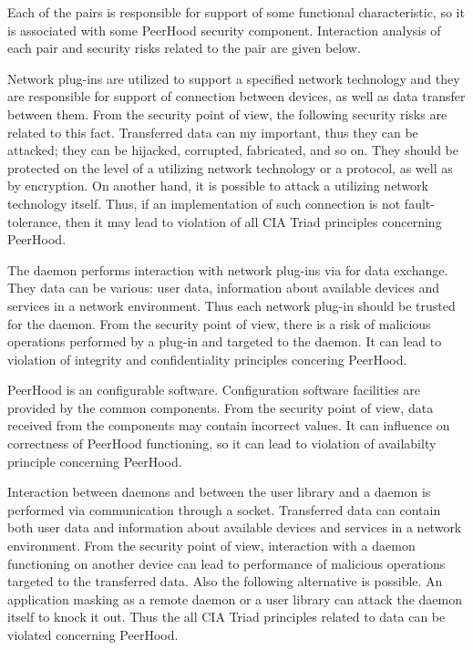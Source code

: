 %
Each of the pairs is responsible for support of some functional characteristic, so it is associated with some PeerHood security component. 
%
Interaction analysis of each pair and security risks related to the pair are given below. 

%
Network plug-ins are utilized to support a specified network technology and they are responsible for support of connection between devices, as well as data transfer between them. 
%
From the security point of view, the following security risks are related to this fact. 
%
Transferred data can my important, thus they can be attacked; they can be hijacked, corrupted, fabricated, and so on. 
%
They should be protected on the level of a utilizing network technology or a protocol, as well as by encryption. 
%
On another hand, it is possible to attack a utilizing network technology itself. 
%
Thus, if an implementation of such connection is not fault-tolerance, then it may lead to violation of all CIA Triad principles concerning PeerHood. 

%
The daemon performs interaction with network plug-ins via  for data exchange. 
%
They data can be various: user data, information about available devices and services in a network environment. 
%
Thus each network plug-in should be trusted for the daemon. 
%
From the security point of view, there is a risk of malicious operations performed by a plug-in and targeted to the daemon. 
%
It can lead to violation of integrity and confidentiality principles concering PeerHood. 

%
PeerHood is an configurable software. 
%
Configuration software facilities are provided by the common components. 
%
From the security point of view, data received from the components may contain incorrect values. 
%
It can influence on correctness of PeerHood functioning, so it can lead to violation of availabilty principle concerning PeerHood. 

%
Interaction between daemons and between the user library and a daemon is performed via communication through a socket. 
%
Transferred data can contain both user data and information about available devices and services in a network environment. 
%
From the security point of view, interaction with a daemon functioning on another device can lead to performance of malicious operations targeted to the transferred data. 
%
Also the following alternative is possible. 
%
An application masking as a remote daemon or a user library can attack the daemon itself to knock it out. 
%
Thus the all CIA Triad principles related to data can be violated concerning PeerHood. 

